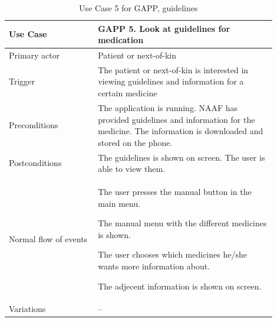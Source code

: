 \begin{table}
	\begin{center}
	    \begin{tabular}{|p{0.3\linewidth}|p{0.6\linewidth}|}
	    \hline
	    Use Case & GAPP 5. Look at guidelines for medication \\ \hline
	    Primary actor & Patient or next-of-kin \\ \hline
	    Trigger & The patient or next-of-kin is interested in viewing guidelines and information for a certain medicine \\ \hline
	    Preconditions & The application is running. NAAF has provided guidelines and information for the medicine. The information is downloaded and stored on the phone. \\ \hline
	    Postconditions & The guidelines is shown on screen. The user is able to view them. \\ \hline
	    Normal flow of events & 
	    	\begin{tabulenum}
	    	  \item The user presses the manual button in the main menu.
	    	  \item The manual menu with the different medicines is shown.
	    	  \item The user chooses which medicines he/she wants more information about.
	    	  \item The adjecent information is shown on screen.
	    	\end{tabulenum} \\ \hline
	    Variations & -- \\ \hline
	    \end{tabular}
    \end{center}
    \caption{Use Case 5 for GAPP, guidelines}
    \label{tab:gappUseCase5}
\end{table}


